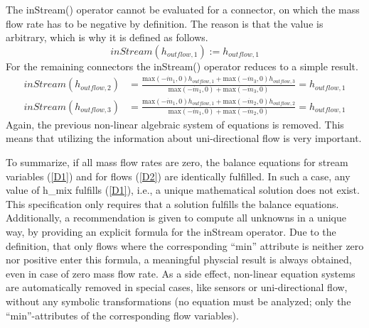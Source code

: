 The inStream() operator cannot be evaluated for a connector, on which
the mass flow rate has to be negative by definition. The reason is that
the value is arbitrary, which is why it is defined as follows.
\begin{equation*}
inStream(h_{outflow,1}):=h_{outflow,1}
\end{equation*}
For the remaining connectors the inStream() operator reduces to a simple
result.
\begin{eqnarray*}
inStream(h_{outflow,2})&=\frac{\text{max}(-\dot{m}_1,0)h_{outflow,1}+\text{max}(-\dot{m}_3,0)h_{outflow,3}}{\text{max}(-\dot{m}_1,0)+\text{max}(-\dot{m}_3,0)}=h_{outflow,1}\\
inStream(h_{outflow,3})&=\frac{\text{max}(-\dot{m}_1,0)h_{outflow,1}+\text{max}(-\dot{m}_2,0)h_{outflow,2}}{\text{max}(-\dot{m}_1,0)+\text{max}(-\dot{m}_2,0)}=h_{outflow,1}
\end{eqnarray*}
Again, the previous non-linear algebraic system of equations is removed.
This means that utilizing the information about uni-directional flow is
very important.

To summarize, if all mass flow rates are zero, the balance equations for
stream variables (\ref{D1}) and for flows (\ref{D2}) are identically fulfilled. In
such a case, any value of h\_mix fulfills (\ref{D1}), i.e., a unique
mathematical solution does not exist. This specification only requires
that a solution fulfills the balance equations. Additionally, a
recommendation is given to compute all unknowns in a unique way, by
providing an explicit formula for the inStream operator. Due to the
definition, that only flows where the corresponding ``min'' attribute is
neither zero nor positive enter this formula, a meaningful physcial
result is always obtained, even in case of zero mass flow rate. As a
side effect, non-linear equation systems are automatically removed in
special cases, like sensors or uni-directional flow, without any
symbolic transformations (no equation must be analyzed; only the
``min''-attributes of the corresponding flow variables).
